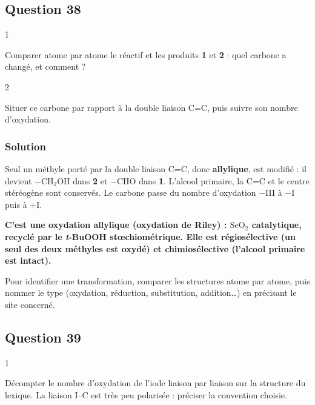 \documentclass[11pt,a4paper]{article}
\begin{document}
\hypertarget{question-38}{%
\subsection{Question 38}\label{question-38}}

\begin{indication}{1}

Comparer atome par atome le réactif et les produits \textbf{1} et \textbf{2} : quel carbone a changé, et comment ?

\end{indication}

\begin{indication}{2}

Situer ce carbone par rapport à la double liaison C=C, puis suivre son nombre d'oxydation.

\end{indication}

\hypertarget{solution-37}{%
\subsubsection{Solution}\label{solution-37}}

Seul un méthyle porté par la double liaison C=C, donc \textbf{allylique}, est modifié : il devient \(\mathrm{-CH_2OH}\) dans \textbf{2} et \(\mathrm{-CHO}\) dans \textbf{1}. L'alcool primaire, la C=C et le centre stéréogène sont conservés. Le carbone passe du nombre d'oxydation −III à −I puis à +I.

\textbf{C'est une oxydation allylique (oxydation de Riley) : \(\mathrm{SeO_2}\) catalytique, recyclé par le \emph{t}-BuOOH stœchiométrique. Elle est régiosélective (un seul des deux méthyles est oxydé) et chimiosélective (l'alcool primaire est intact).}

\begin{methode}

Pour identifier une transformation, comparer les structures atome par atome, puis nommer le type (oxydation, réduction, substitution, addition\ldots) en précisant le site concerné.

\end{methode}

\hypertarget{question-39}{%
\subsection{Question 39}\label{question-39}}

\begin{indication}{1}

Décompter le nombre d'oxydation de l'iode liaison par liaison sur la structure du lexique. La liaison I--C est très peu polarisée : préciser la convention choisie.

\end{indication}
\end{document}
